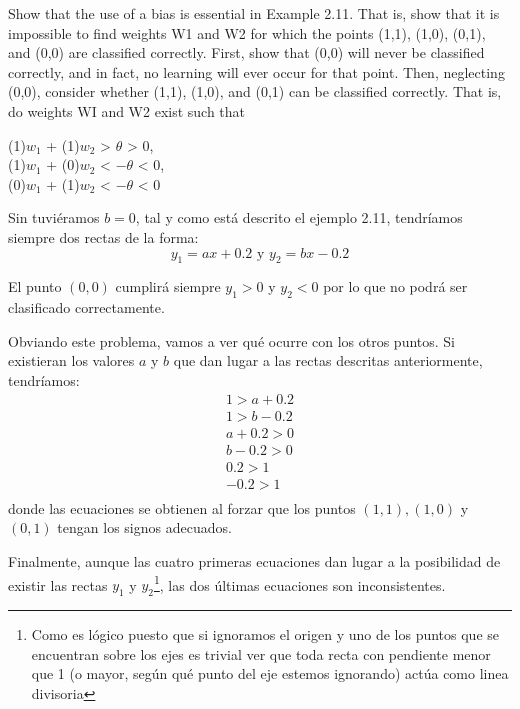 \begin{problem}[9]
 Show that the use of a bias is essential in Example 2.11. That is, show that it is
impossible to find weights W1 and W2 for which the points (1,1), (1,0), (0,1), and (0,0)
are classified correctly. First, show that (0,0) will never be classified correctly, and
in fact, no learning will ever occur for that point. Then, neglecting (0,0), consider
whether (1,1), (1,0), and (0,1) can be classified correctly. That is, do weights WI and
W2 exist such that
\begin{center}
(1)$w_1$ + (1)$w_2$ > $\theta $ > 0,\\
(1)$w_1$ + (0)$w_2$ < $-\theta $ < 0,\\
(0)$w_1$ + (1)$w_2$ < $-\theta $ < 0
\end{center}
\solution

Sin tuviéramos $b=0$, tal y como está descrito el ejemplo 2.11, tendríamos siempre dos rectas de la forma:
\[y_1=ax+0.2 \text{ y } y_2 = bx - 0.2\]

El punto $(0,0)$ cumplirá siempre $y_1>0$ y $y_2<0$ por lo que no podrá ser clasificado correctamente.

Obviando este problema, vamos a ver qué ocurre con los otros puntos. Si existieran los valores $a$ y $b$ que dan lugar a las rectas descritas anteriormente, tendríamos:
\[\begin{array}{l}
1 > a+0.2 \\
1 > b-0.2 \\
a+0.2 > 0 \\
b-0.2 > 0 \\
0.2 > 1 \\
-0.2 > 1\\
\end{array}\]
donde las ecuaciones se obtienen al forzar que los puntos $(1,1), (1,0)$ y $(0,1)$ tengan los signos adecuados.

Finalmente, aunque las cuatro primeras ecuaciones dan lugar a la posibilidad de existir las rectas $y_1$ y $y_2$\footnote{Como es lógico puesto que si ignoramos el origen y uno de los puntos que se encuentran sobre los ejes es trivial ver que toda recta con pendiente menor que 1 (o mayor, según qué punto del eje estemos ignorando) actúa como linea divisoria}, las dos últimas ecuaciones son inconsistentes.

\end{problem}

